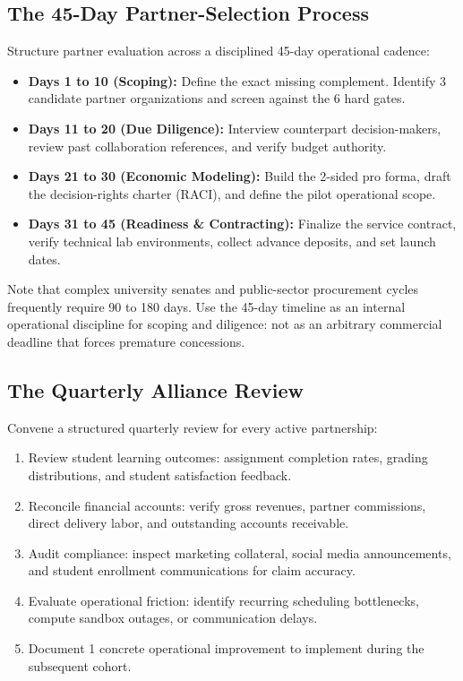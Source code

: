 \subsection{The 45-Day Partner-Selection Process}
\label{sec:forty_five_day_partner_selection}

Structure partner evaluation across a disciplined 45-day operational cadence:
\begin{itemize}
\item \textbf{Days 1 to 10 (Scoping):} Define the exact missing complement. Identify 3 candidate partner organizations and screen against the 6 hard gates.
\item \textbf{Days 11 to 20 (Due Diligence):} Interview counterpart decision-makers, review past collaboration references, and verify budget authority.
\item \textbf{Days 21 to 30 (Economic Modeling):} Build the 2-sided pro forma, draft the decision-rights charter (RACI), and define the pilot operational scope.
\item \textbf{Days 31 to 45 (Readiness \& Contracting):} Finalize the service contract, verify technical lab environments, collect advance deposits, and set launch dates.
\end{itemize}
Note that complex university senates and public-sector procurement cycles frequently require 90 to 180 days. Use the 45-day timeline as an internal operational discipline for scoping and diligence: not as an arbitrary commercial deadline that forces premature concessions.

\subsection{The Quarterly Alliance Review}
\label{sec:quarterly_alliance_review}

Convene a structured quarterly review for every active partnership:
\begin{enumerate}
\item Review student learning outcomes: assignment completion rates, grading distributions, and student satisfaction feedback.
\item Reconcile financial accounts: verify gross revenues, partner commissions, direct delivery labor, and outstanding accounts receivable.
\item Audit compliance: inspect marketing collateral, social media announcements, and student enrollment communications for claim accuracy.
\item Evaluate operational friction: identify recurring scheduling bottlenecks, compute sandbox outages, or communication delays.
\item Document 1 concrete operational improvement to implement during the subsequent cohort.
\end{enumerate}

